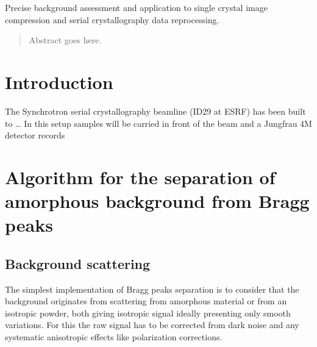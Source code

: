 \documentclass[preprint]{iucr}              %
\begin{document}
\maketitle                        %

\begin{synopsis}
Precise background assessment and application to single crystal image compression and serial crystallography data reprocessing. 
\end{synopsis}

\begin{abstract}
Abstract goes here.
\end{abstract}



\section{Introduction}

The Synchrotron serial crystallography beamline (ID29 at ESRF) has been built to \ldots
In this setup samples will be carried in front of the beam and a Jungfrau 4M detector records 


\section{Algorithm for the separation of amorphous background from Bragg peaks}
\subsection{Background scattering}

The simplest implementation of Bragg peaks separation is to consider that the background originates from scattering from amorphous material or from an isotropic powder, both giving isotropic signal ideally presenting only smooth variations.
For this the raw signal has to be corrected from dark noise and any systematic anisotropic effects like polarization corrections.
\end{document}
